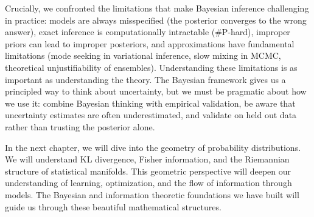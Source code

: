 Crucially, we confronted the limitations that make Bayesian inference challenging in practice: models are always misspecified (the posterior converges to the wrong answer), exact inference is computationally intractable (\#P-hard), improper priors can lead to improper posteriors, and approximations have fundamental limitations (mode seeking in variational inference, slow mixing in MCMC, theoretical unjustifiability of ensembles). Understanding these limitations is as important as understanding the theory. The Bayesian framework gives us a principled way to think about uncertainty, but we must be pragmatic about how we use it: combine Bayesian thinking with empirical validation, be aware that uncertainty estimates are often underestimated, and validate on held out data rather than trusting the posterior alone.

In the next chapter, we will dive into the geometry of probability distributions. We will understand KL divergence, Fisher information, and the Riemannian structure of statistical manifolds. This geometric perspective will deepen our understanding of learning, optimization, and the flow of information through models. The Bayesian and information theoretic foundations we have built will guide us through these beautiful mathematical structures.